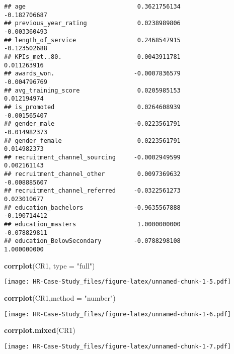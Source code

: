 \documentclass[
]{article}
\newenvironment{Shaded}{\begin{snugshade}}{\end{snugshade}}
\newcommand{\DataTypeTok}[1]{\textcolor[rgb]{0.13,0.29,0.53}{#1}}
\newcommand{\KeywordTok}[1]{\textcolor[rgb]{0.13,0.29,0.53}{\textbf{#1}}}
\newcommand{\NormalTok}[1]{#1}
\newcommand{\StringTok}[1]{\textcolor[rgb]{0.31,0.60,0.02}{#1}}
\begin{document}
\begin{verbatim}
## age                               0.3621756134             -0.182706687
## previous_year_rating              0.0238989806             -0.003360493
## length_of_service                 0.2468547915             -0.123502688
## KPIs_met..80.                     0.0043911781              0.011263916
## awards_won.                      -0.0007836579             -0.004796769
## avg_training_score                0.0205985153              0.012194974
## is_promoted                       0.0264608939             -0.001565407
## gender_male                      -0.0223561791             -0.014982373
## gender_female                     0.0223561791              0.014982373
## recruitment_channel_sourcing     -0.0002949599              0.002161143
## recruitment_channel_other         0.0097369632             -0.008885607
## recruitment_channel_referred     -0.0322561273              0.023010677
## education_bachelors              -0.9635567888             -0.190714412
## education_masters                 1.0000000000             -0.078829811
## education_BelowSecondary         -0.0788298108              1.000000000
\end{verbatim}

\begin{Shaded}
\begin{Highlighting}[]
\KeywordTok{corrplot}\NormalTok{(CR1, }\DataTypeTok{type =} \StringTok{"full"}\NormalTok{)}
\end{Highlighting}
\end{Shaded}

\texttt{[image: HR-Case-Study\_files/figure-latex/unnamed-chunk-1-5.pdf]}

\begin{Shaded}
\begin{Highlighting}[]
\KeywordTok{corrplot}\NormalTok{(CR1,}\DataTypeTok{method =} \StringTok{"number"}\NormalTok{)}
\end{Highlighting}
\end{Shaded}

\texttt{[image: HR-Case-Study\_files/figure-latex/unnamed-chunk-1-6.pdf]}

\begin{Shaded}
\begin{Highlighting}[]
\KeywordTok{corrplot.mixed}\NormalTok{(CR1)}
\end{Highlighting}
\end{Shaded}

\texttt{[image: HR-Case-Study\_files/figure-latex/unnamed-chunk-1-7.pdf]}
\end{document}
